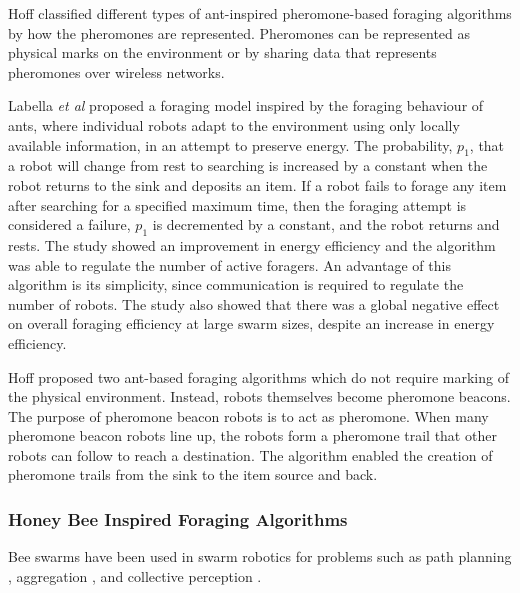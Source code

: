 \documentclass[preprint,12pt]{elsarticle}
\begin{document}
Hoff \cite{hoff2010two} classified different types of ant-inspired pheromone-based foraging algorithms by how the pheromones are represented. Pheromones can be represented as physical marks on the environment \cite{fujisawa2008communication} or by sharing data that represents pheromones over wireless networks.

Labella \textit{et al} \cite{labella2006division} proposed a foraging model inspired by the foraging behaviour of ants, where individual robots adapt to the environment using only locally available information, in an attempt to preserve energy. The probability, $p_1$, that a robot will change from rest to searching is increased by a constant when the robot returns to the sink and deposits an item. If a robot fails to forage any item after searching for a specified maximum time, then the foraging attempt is considered a failure, $p_1$ is decremented by a constant, and the robot returns and rests. The study showed an improvement in energy efficiency and the algorithm was able to regulate the number of active foragers. An advantage of this algorithm is its simplicity, since communication is required to regulate the number of robots. The study also showed that there was a global negative effect on overall foraging efficiency at large swarm sizes, despite an increase in energy efficiency.

Hoff \cite{hoff2010two} proposed two ant-based foraging algorithms which do not require marking of the physical environment. Instead, robots themselves become pheromone beacons. The purpose of pheromone beacon robots is to act as pheromone. When many pheromone beacon robots line up, the robots form a pheromone trail that other robots can follow to reach a destination. The algorithm enabled the creation of pheromone trails from the sink to the item source and back.

\subsubsection{Honey Bee Inspired Foraging Algorithms}
Bee swarms have been used in swarm robotics for problems such as path planning \cite{lin2009chaotic}, aggregation \cite{kernbach2009re}, and collective perception \cite{schmickl2007collective}. 
\end{document}
